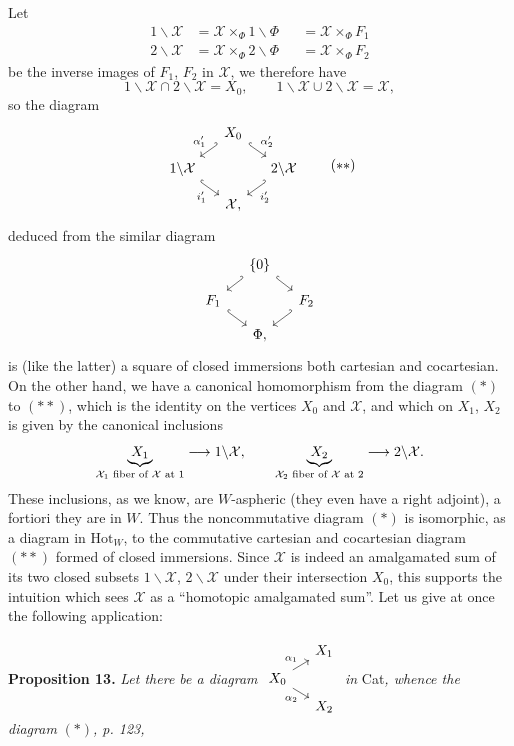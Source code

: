 \documentclass[11pt]{article}
\newcommand{\printedpage}[1]{\marginpar{\footnotesize p.~#1}}
\newcommand{\msp}[1]{\marginpar{\footnotesize [#1]}}
\newcommand{\Hot}{\mathrm{Hot}}
\newcommand{\cX}{\mathcal{X}}
\begin{document}
\printedpage{84}
Let
\[
\begin{aligned}
1\backslash\cX &= \cX\times_{\Phi} 1\backslash\Phi &&= \cX\times_{\Phi} F_1\\
2\backslash\cX &= \cX\times_{\Phi} 2\backslash\Phi &&= \cX\times_{\Phi} F_2
\end{aligned}
\]
be the inverse images of $F_1$, $F_2$ in $\cX$, we therefore have
\[
1\backslash\cX\cap 2\backslash\cX = X_0, \qquad 1\backslash\cX\cup 2\backslash\cX = \cX,
\]
so the diagram
\[
\begin{tikzcd}[column sep=small, row sep=small, ampersand replacement=\&]
 \& X_0 \arrow[dl, hook', "\alpha'_1"'] \arrow[dr, hook, "\alpha'_2"] \& \\
1\backslash\cX \arrow[dr, hook, "i'_1"'] \& \& 2\backslash\cX \arrow[dl, hook', "i'_2"] \\
 \& \cX, \&
\end{tikzcd}
\tag*{$(**)$}
\]
deduced from the similar diagram
\[
\begin{tikzcd}[column sep=small, row sep=small, ampersand replacement=\&]
 \& \{0\} \arrow[dl, hook'] \arrow[dr, hook] \& \\
F_1 \arrow[dr, hook] \& \& F_2 \arrow[dl, hook'] \\
 \& \Phi, \&
\end{tikzcd}
\]
is (like the latter) a square of closed immersions both cartesian and cocartesian. On the other hand, we have a canonical homomorphism
\msp{page 125}
from the diagram $(*)$ to $(**)$, which is the identity on the vertices $X_0$ and $\cX$, and which on $X_1$, $X_2$ is given by the canonical inclusions
\[
\underbrace{X_1}_{\text{\scriptsize $\cX_1$ fiber of $\cX$ at 1}} \longrightarrow 1\backslash\cX, \qquad
\underbrace{X_2}_{\text{\scriptsize $\cX_2$ fiber of $\cX$ at 2}} \longrightarrow 2\backslash\cX.
\]
These inclusions, as we know, are $W$-aspheric (they even have a right adjoint), a fortiori they are in $W$. Thus the noncommutative diagram $(*)$ is isomorphic, as a diagram in $\Hot_W$, to the commutative cartesian and cocartesian diagram $(**)$ formed of closed immersions. Since $\cX$ is indeed an amalgamated sum of its two closed subsets %
$1\backslash\cX$, $2\backslash\cX$ under their intersection $X_0$, this supports the intuition which sees $\cX$ as a ``homotopic amalgamated sum''. Let us give at once the following application:

\textbf{Proposition 13.} \textit{Let there be a diagram} $\begin{tikzcd}[column sep=small, row sep=tiny, ampersand replacement=\&, baseline=(\tikzcdmatrixname-2-1.base)]
 \& X_1 \\
X_0 \arrow[ur, "\alpha_1"] \arrow[dr, "\alpha_2"'] \& \\
 \& X_2
\end{tikzcd}$ \textit{in} Cat\textit{, whence the diagram} $(*)$\textit{, p. 123,}
\end{document}
